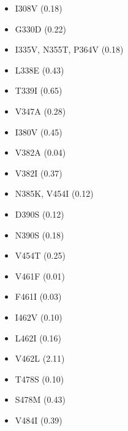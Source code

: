 \documentclass[11pt,oneside,letterpaper]{article}
\begin{document}
\begin{table}[ht]
\begin{multicols}{3}
\begin{itemize}
      \item I308V (0.18)
      \item G330D (0.22)
      \item I335V, N355T, P364V (0.18)
      \item L338E (0.43)
      \item T339I (0.65)
      \item V347A (0.28)
      \item I380V (0.45)
      \item V382A (0.04)
      \item V382I (0.37)
      \item N385K, V454I (0.12)
      \item D390S (0.12)
      \item N390S (0.18)
      \item V454T (0.25)
      \item V461F (0.01)
      \item F461I (0.03)
      \item I462V (0.10)
      \item L462I (0.16)
      \item V462L (2.11)
      \item T478S (0.10)
      \item S478M (0.43)
      \item V484I (0.39)
    \end{itemize}
  \end{multicols}
\end{table}
\end{document}
